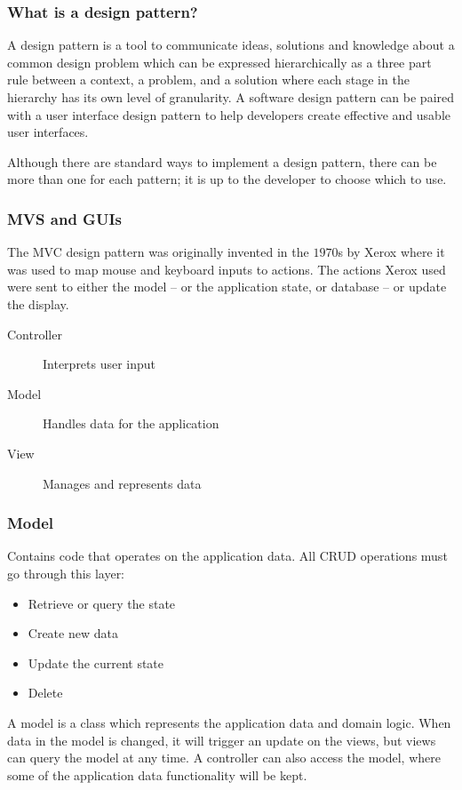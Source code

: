 \subsubsection{What is a design pattern?}\label{ssub:what_is_a_design_pattern_}

A design pattern is a tool to communicate ideas, solutions and knowledge about a common design problem which can be expressed hierarchically as a three part rule between a context, a problem, and a solution where each stage in the hierarchy has its own level of granularity.
A software design pattern can be paired with a user interface design pattern to help developers create effective and usable user interfaces.

\begin{note}
    Although there are standard ways to implement a design pattern, there can be more than one for each pattern; it is up to the developer to choose which to use.
\end{note}

\subsubsection{MVS and GUIs}\label{ssub:mvs_and_guis}

The MVC design pattern was originally invented in the \(1970\)s by Xerox where it was used to map mouse and keyboard inputs to actions.
The actions Xerox used were sent to either the model -- or the application state, or database -- or update the display.

\begin{description}
    \item[Controller] Interprets user input
    \item[Model] Handles data for the application
    \item[View] Manages and represents data
\end{description}

\subsubsection{Model}\label{ssub:model}

Contains code that operates on the application data.
All CRUD operations must go through this layer:
\begin{itemize}
    \item Retrieve or query the state
    \item Create new data
    \item Update the current state
    \item Delete
\end{itemize}
A model is a class which represents the application data and domain logic.
When data in the model is changed, it will trigger an update on the views, but views can query the model at any time.
A controller can also access the model, where some of the application data functionality will be kept.

